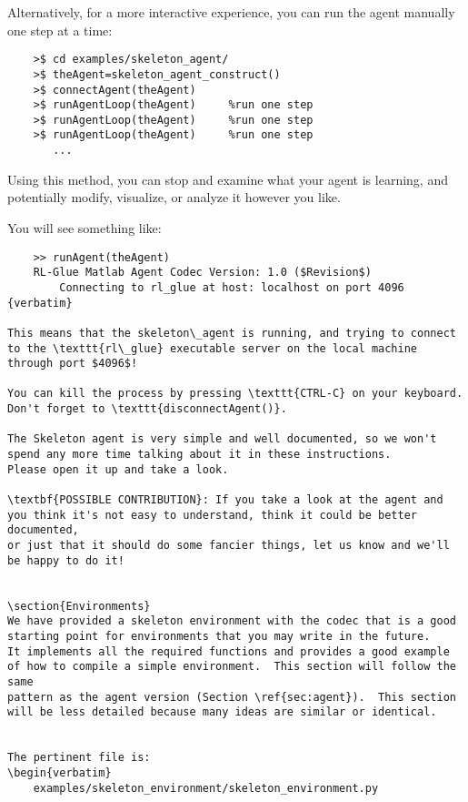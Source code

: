 \documentclass[11pt]{article}
\begin{document}
Alternatively, for a more interactive experience, you can run the agent manually one step at a time:
\begin{verbatim}
	>$ cd examples/skeleton_agent/
	>$ theAgent=skeleton_agent_construct()
	>$ connectAgent(theAgent)
	>$ runAgentLoop(theAgent)     %run one step
	>$ runAgentLoop(theAgent)     %run one step
	>$ runAgentLoop(theAgent)     %run one step
	   ...
\end{verbatim}

Using this method, you can stop and examine what your agent is learning, and potentially modify, visualize, or analyze it however you like.

You will see something like:
\begin{verbatim}
	>> runAgent(theAgent)
	RL-Glue Matlab Agent Codec Version: 1.0 ($Revision$)
	    Connecting to rl_glue at host: localhost on port 4096
{verbatim}

This means that the skeleton\_agent is running, and trying to connect to the \texttt{rl\_glue} executable server on the local machine through port $4096$! 

You can kill the process by pressing \texttt{CTRL-C} on your keyboard.  Don't forget to \texttt{disconnectAgent()}.

The Skeleton agent is very simple and well documented, so we won't spend any more time talking about it in these instructions.
Please open it up and take a look.

\textbf{POSSIBLE CONTRIBUTION}: If you take a look at the agent and you think it's not easy to understand, think it could be better documented, 
or just that it should do some fancier things, let us know and we'll be happy to do it!


\section{Environments}
We have provided a skeleton environment with the codec that is a good starting point for environments that you may write in the future.
It implements all the required functions and provides a good example of how to compile a simple environment.  This section will follow the same 
pattern as the agent version (Section \ref{sec:agent}).  This section will be less detailed because many ideas are similar or identical.


The pertinent file is:
\begin{verbatim}
	examples/skeleton_environment/skeleton_environment.py
\end{verbatim}
\end{document}
